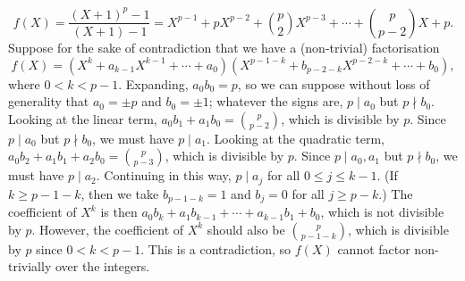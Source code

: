 \begin{enumerate}
\begin{enumerate}
\begin{equation*}
f(X) = \frac{(X + 1)^p - 1}{(X + 1) - 1} = X^{p - 1} + pX^{p - 2} + \binom{p}{2}X^{p - 3} + \cdots + \binom{p}{p - 2}X + p.
\end{equation*}
Suppose for the sake of contradiction that we have a (non-trivial) factorisation
\begin{equation*}
f(X) = (X^k + a_{k - 1}X^{k - 1} + \cdots + a_0)(X^{p - 1 - k} + b_{p - 2 - k}X^{p - 2 - k} + \cdots + b_0),
\end{equation*}
where $0 < k < p - 1$. Expanding, $a_0b_0 = p$, so we can suppose without loss of generality that $a_0 = \pm p$ and $b_0 = \pm 1$; whatever the signs are, $p\mid a_0$ but $p\nmid b_0$. Looking at the linear term, $a_0b_1 + a_1b_0 = \binom{p}{p - 2}$, which is divisible by $p$. Since $p\mid a_0$ but $p\nmid b_0$, we must have $p\mid a_1$. Looking at the quadratic term, $a_0b_2 + a_1b_1 + a_2b_0 = \binom{p}{p - 3}$, which is divisible by $p$. Since $p\mid a_0, a_1$ but $p\nmid b_0$, we must have $p\mid a_2$. Continuing in this way, $p\mid a_j$ for all $0\leq j\leq k - 1$. (If $k\geq p - 1 - k$, then we take $b_{p - 1 - k} = 1$ and $b_j = 0$ for all $j\geq p - k$.) The coefficient of $X^k$ is then $a_0b_k + a_1b_{k - 1} + \cdots + a_{k - 1}b_1 + b_0$, which is not divisible by $p$. However, the coefficient of $X^k$ should also be $\binom{p}{p - 1 - k}$, which is divisible by $p$ since $0 < k < p - 1$. This is a contradiction, so $f(X)$ cannot factor non-trivially over the integers.
\end{enumerate}
\end{enumerate}